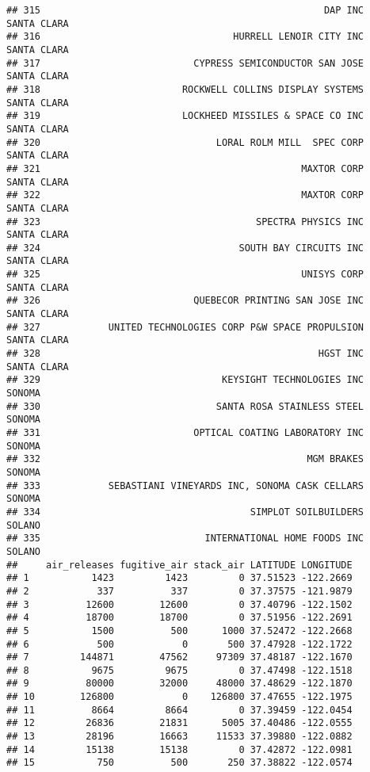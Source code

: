\documentclass[
]{book}
\begin{document}
\begin{verbatim}
## 315                                                  DAP INC   SANTA CLARA
## 316                                  HURRELL LENOIR CITY INC   SANTA CLARA
## 317                           CYPRESS SEMICONDUCTOR SAN JOSE   SANTA CLARA
## 318                         ROCKWELL COLLINS DISPLAY SYSTEMS   SANTA CLARA
## 319                         LOCKHEED MISSILES & SPACE CO INC   SANTA CLARA
## 320                               LORAL ROLM MILL  SPEC CORP   SANTA CLARA
## 321                                              MAXTOR CORP   SANTA CLARA
## 322                                              MAXTOR CORP   SANTA CLARA
## 323                                      SPECTRA PHYSICS INC   SANTA CLARA
## 324                                   SOUTH BAY CIRCUITS INC   SANTA CLARA
## 325                                              UNISYS CORP   SANTA CLARA
## 326                           QUEBECOR PRINTING SAN JOSE INC   SANTA CLARA
## 327            UNITED TECHNOLOGIES CORP P&W SPACE PROPULSION   SANTA CLARA
## 328                                                 HGST INC   SANTA CLARA
## 329                                KEYSIGHT TECHNOLOGIES INC        SONOMA
## 330                               SANTA ROSA STAINLESS STEEL        SONOMA
## 331                           OPTICAL COATING LABORATORY INC        SONOMA
## 332                                               MGM BRAKES        SONOMA
## 333            SEBASTIANI VINEYARDS INC, SONOMA CASK CELLARS        SONOMA
## 334                                     SIMPLOT SOILBUILDERS        SOLANO
## 335                             INTERNATIONAL HOME FOODS INC        SOLANO
##     air_releases fugitive_air stack_air LATITUDE LONGITUDE
## 1           1423         1423         0 37.51523 -122.2669
## 2            337          337         0 37.37575 -121.9879
## 3          12600        12600         0 37.40796 -122.1502
## 4          18700        18700         0 37.51956 -122.2691
## 5           1500          500      1000 37.52472 -122.2668
## 6            500            0       500 37.47928 -122.1722
## 7         144871        47562     97309 37.48187 -122.1670
## 8           9675         9675         0 37.47498 -122.1518
## 9          80000        32000     48000 37.48629 -122.1870
## 10        126800            0    126800 37.47655 -122.1975
## 11          8664         8664         0 37.39459 -122.0454
## 12         26836        21831      5005 37.40486 -122.0555
## 13         28196        16663     11533 37.39880 -122.0882
## 14         15138        15138         0 37.42872 -122.0981
## 15           750          500       250 37.38822 -122.0574

\end{verbatim}
\end{document}
